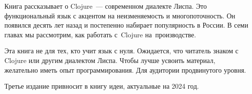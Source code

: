 \thispagestyle{empty}

Книга рассказывает о Clojure~--- современном диалекте Лиспа. Это функциональный
язык с акцентом на неизменяемость и многопоточность. Он появился десять лет
назад и постепенно набирает популярность в России. В семи главах мы рассмотрим,
как работать с~Clojure на~производстве.

Эта книга не для тех, кто учит язык с нуля. Ожидается, что читатель знаком с
Clojure или другим диалектом Лиспа. Чтобы лучше усвоить материал, желательно
иметь опыт программирования. Для аудитории продвинутого уровня.

Третье издание привносит в книгу идеи, актуальные на 2024 год.
